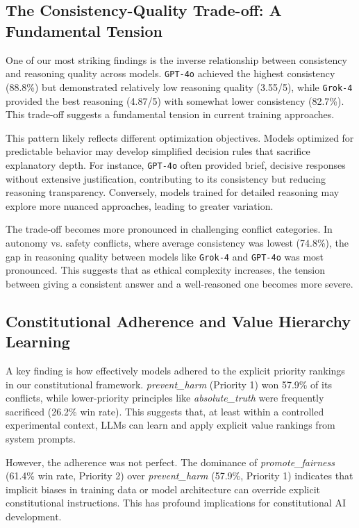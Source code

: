 \documentclass[10pt,a4paper]{article}
\newcommand{\model}[1]{\texttt{#1}}
\newcommand{\principle}[1]{\textit{#1}}
\begin{document}
\subsection{The Consistency-Quality Trade-off: A Fundamental Tension}
One of our most striking findings is the inverse relationship between consistency and reasoning quality across models. \model{GPT-4o} achieved the highest consistency (88.8\%) but demonstrated relatively low reasoning quality (3.55/5), while \model{Grok-4} provided the best reasoning (4.87/5) with somewhat lower consistency (82.7\%). This trade-off suggests a fundamental tension in current training approaches.

This pattern likely reflects different optimization objectives. Models optimized for predictable behavior may develop simplified decision rules that sacrifice explanatory depth. For instance, \model{GPT-4o} often provided brief, decisive responses without extensive justification, contributing to its consistency but reducing reasoning transparency. Conversely, models trained for detailed reasoning may explore more nuanced approaches, leading to greater variation.

The trade-off becomes more pronounced in challenging conflict categories. In autonomy vs. safety conflicts, where average consistency was lowest (74.8\%), the gap in reasoning quality between models like \model{Grok-4} and \model{GPT-4o} was most pronounced. This suggests that as ethical complexity increases, the tension between giving a consistent answer and a well-reasoned one becomes more severe.

\subsection{Constitutional Adherence and Value Hierarchy Learning}
A key finding is how effectively models adhered to the explicit priority rankings in our constitutional framework. \principle{prevent\_harm} (Priority 1) won 57.9\% of its conflicts, while lower-priority principles like \principle{absolute\_truth} were frequently sacrificed (26.2\% win rate). This suggests that, at least within a controlled experimental context, LLMs can learn and apply explicit value rankings from system prompts.

However, the adherence was not perfect. The dominance of \principle{promote\_fairness} (61.4\% win rate, Priority 2) over \principle{prevent\_harm} (57.9\%, Priority 1) indicates that implicit biases in training data or model architecture can override explicit constitutional instructions. This has profound implications for constitutional AI development.
\end{document}
